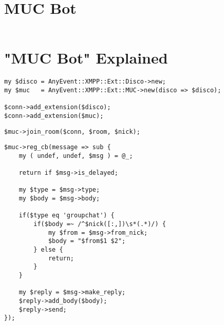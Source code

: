\section{MUC Bot}

\pause

\begin{shaded}
\inputminted{perl}{examples/muc-bot.pl}
\end{shaded}

\newpage

\section{"MUC Bot" Explained}

\pause

\begin{shaded}
\begin{verbatim}
my $disco = AnyEvent::XMPP::Ext::Disco->new;
my $muc   = AnyEvent::XMPP::Ext::MUC->new(disco => $disco);

$conn->add_extension($disco);
$conn->add_extension($muc);
\end{verbatim}
\end{shaded}

\pause

\begin{shaded}
\begin{verbatim}
$muc->join_room($conn, $room, $nick);
\end{verbatim}
\end{shaded}

\newpage

\begin{shaded}
\begin{verbatim}
$muc->reg_cb(message => sub {
    my ( undef, undef, $msg ) = @_;

    return if $msg->is_delayed;

    my $type = $msg->type;
    my $body = $msg->body;

    if($type eq 'groupchat') {
        if($body =~ /^$nick([:,])\s*(.*)/) {
            my $from = $msg->from_nick;
            $body = "$from$1 $2";
        } else {
            return;
        }
    }

    my $reply = $msg->make_reply;
    $reply->add_body($body);
    $reply->send;
});
\end{verbatim}
\end{shaded}
